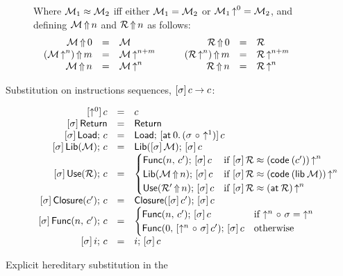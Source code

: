 \documentclass[11pt]{article}
\begin{document}
\begin{figure}
\begin{description}
    Where $\mathcal{M}_1 \approx \mathcal{M}_2$ iff either $\mathcal{M}_1 = \mathcal{M}_2$ or ${\mathcal{M}_1}\mathop{\uparrow}^{0} = \mathcal{M}_2$,
    and defining ${\mathcal{M}}\mathop{\Uparrow}{n}$ and ${\mathcal{R}}\mathop{\Uparrow}{n}$ as follows:
    \[\begin{array}{rcl}
      {\ensuremath{\mathcal{M}}}\mathop{\Uparrow}{0} &=& \mathcal{M}\\
      {({\mathcal{M}}\mathop{\uparrow}^{n})}\mathop{\Uparrow}{m} &=& {\mathcal{M}}\mathop{\uparrow}^{n+m}\\
      {\mathcal{M}}\mathop{\Uparrow}{n} &=& {\mathcal{M}}\mathop{\uparrow}^{n}
      \end{array}\qquad\begin{array}{rcl}
      {\ensuremath{\mathcal{R}}}\mathop{\Uparrow}{0} &=& \mathcal{R}\\
      {({\mathcal{R}}\mathop{\uparrow}^{n})}\mathop{\Uparrow}{m} &=& {\mathcal{R}}\mathop{\uparrow}^{n+m}\\
      {\mathcal{R}}\mathop{\Uparrow}{n} &=& {\mathcal{R}}\mathop{\uparrow}^{n}
    \end{array}\]

  \item[Substitution on instructions sequences, $[{\sigma}]\,{c} \to c$:]
    \[\begin{array}{rcl}
      \esub{\sid}{c} &=& c\\
      \esub{\sigma}{\Return} &=& \Return\\
      \esub{\sigma}{\Load\semi c} &=&
      \Load\semi \esub{\at{0} \cons (\sigma \o \shift{1})}{c}\\
      \esub{\sigma}{\Lib{\M}\semi c} &=& \Lib{\esub{\sigma}{\M}}\semi \esub{\sigma}{c}\\
      \esub{\sigma}{\Use{\R}\semi c} &=&
      \begin{cases}
        \Func{n}{c'}\semi \esub{\sigma}{c} &
        \text{if}~\esub{\sigma}{\R} \approx \lift{(\code{(c')})}{n}\\
        \Lib{\dolift{\M}{n}}\semi \esub{\sigma}{c} &
        \text{if}~\esub{\sigma}{\R} \approx \lift{(\code{(\lib{\M})})}{n}\\
        \Use{\dolift{\R'}{n}}\semi \esub{\sigma}{c} &
        \text{if}~\esub{\sigma}{\R} \approx \lift{(\at{\R})}{n}
      \end{cases}\\
      \esub{\sigma}{\Closure{c'}\semi c} &=&
      \Closure{\esub{\sigma}{c'}}\semi \esub{\sigma}{c}\\
      \esub{\sigma}{\Func{n}{c'}\semi c} &=&
      \begin{cases}
        \Func{n}{c'}\semi \esub{\sigma}{c} &
        \text{if}~\shift{n} \o \sigma = \shift{n}\\
        \Func{0}{\esub{\shift{n} \o \sigma}{c'}}\semi \esub{\sigma}{c} & \text{otherwise}
      \end{cases}\\
      \esub{\sigma}{i\semi c} &=& i\semi \esub{\sigma}{c}
    \end{array}\]

  \end{description}

  \caption{Explicit hereditary substitution in the \camlib{}}
  \label{fig:camlibsubst}
\end{figure}
\end{document}
